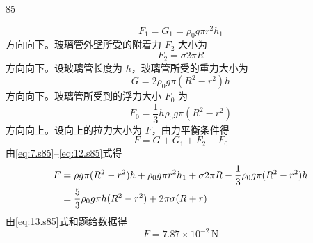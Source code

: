 \begin{solution}{85}
\begin{subsolution}
\begin{subsubsolution}
            \begin{equation}
                F_{1} = G_{1} = \rho_{0} g \pi r^{2} h_{1}
                \label{eq:8.s85}
            \end{equation}
            方向向下。玻璃管外壁所受的附着力 $F_{2}$ 大小为
            \begin{equation}
                F_{2} = \sigma 2\pi R
                \label{eq:9.s85}
            \end{equation}
            方向向下。设玻璃管长度为 $h$，玻璃管所受的重力大小为
            \begin{equation}
                G = 2\rho_{0} g \pi (R^{2} - r^{2}) h
                \label{eq:10.s85}
            \end{equation}
            方向向下。玻璃管所受到的浮力大小 $F_{0}$ 为
            \begin{equation}
                F_{0} = \frac{1}{3} h \rho_{0} g \pi (R^{2} - r^{2})
                \label{eq:11.s85}
            \end{equation}
            方向向上。设向上的拉力大小为 $F$，由力平衡条件得
            \begin{equation}
                F = G + G_{1} + F_{2} - F_{0}
                \label{eq:12.s85}
            \end{equation}
            由\eqref{eq:7.s85}--\eqref{eq:12.s85}式得
            \begin{align}
                F &= \rho g \pi (R^{2} - r^{2}) h + \rho_{0} g \pi r^{2} h_{1} + \sigma 2\pi R - \frac{1}{3} \rho_{0} g \pi (R^{2} - r^{2}) h \notag\\
                &= \frac{5}{3} \rho_{0} g \pi h (R^{2} - r^{2}) + 2\pi \sigma (R+r)
                \label{eq:13.s85}
            \end{align}
            由\eqref{eq:13.s85}式和题给数据得
            \begin{equation}
                F = 7.87 \times 10^{-2}\,\mathrm{N}
                \label{eq:14.s85}
            \end{equation}
        \end{subsubsolution}
    \end{subsolution}
\end{solution}